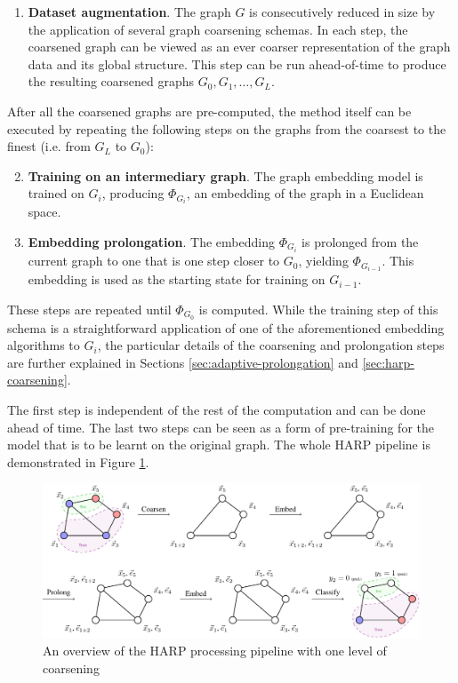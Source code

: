\begin{enumerate}
  \item \textbf{Dataset augmentation}. The graph \( G \) is consecutively reduced in size by the application of several graph coarsening schemas. In each step, the coarsened graph can be viewed as an ever coarser representation of the graph data and its global structure. This step can be run ahead-of-time to produce the resulting coarsened graphs \( G_0, G_1, \dots, G_L \).
\end{enumerate}
After all the coarsened graphs are pre-computed, the method itself can be executed by repeating the following steps on the graphs from the coarsest to the finest (i.e. from \( G_L \) to \( G_0 \)):
\begin{enumerate}\setcounter{enumi}{1}
  \item \textbf{Training on an intermediary graph}. The graph embedding model is trained on \( G_i \), producing \( \Phi_{G_i} \), an embedding of the graph in a Euclidean space.
  \item \textbf{Embedding prolongation}. The embedding \( \Phi_{G_i} \) is prolonged from the current graph to one that is one step closer to \( G_0 \), yielding \( \Phi_{G_{i - 1}} \). This embedding is used as the starting state for training on \( G_{i - 1} \).
\end{enumerate}
These steps are repeated until \( \Phi_{G_0} \) is computed. While the training step of this schema is a straightforward application of one of the aforementioned embedding algorithms to \( G_i \), the particular details of the coarsening and prolongation steps are further explained in Sections \ref{sec:adaptive-prolongation} and \ref{sec:harp-coarsening}.

The first step is independent of the rest of the computation and can be done ahead of time. The last two steps can be seen as a form of pre-training for the model that is to be learnt on the original graph. The whole HARP pipeline is demonstrated in Figure \ref{fig:harp-overview}.

\begin{figure}
  \centering
  \includegraphics[width=\linewidth]{images/harp-overview/harp-overview.pdf}
  \caption{An overview of the HARP processing pipeline with one level of coarsening}
  \label{fig:harp-overview}
\end{figure}

